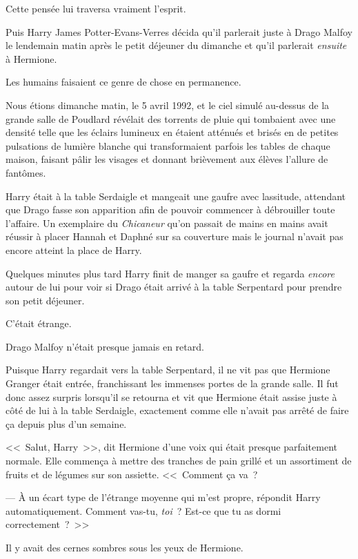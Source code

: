 Cette pensée lui traversa vraiment l'esprit.

Puis Harry James Potter-Evans-Verres décida qu'il parlerait juste à Drago Malfoy le lendemain matin après le petit déjeuner du dimanche et qu'il parlerait \emph{ensuite} à Hermione.

Les humains faisaient ce genre de chose en permanence.

\later

Nous étions dimanche matin, le 5 avril 1992, et le ciel simulé au-dessus de la grande salle de Poudlard révélait des torrents de pluie qui tombaient avec une densité telle que les éclairs lumineux en étaient atténués et brisés en de petites pulsations de lumière blanche qui transformaient parfois les tables de chaque maison, faisant pâlir les visages et donnant brièvement aux élèves l'allure de fantômes.

Harry était à la table Serdaigle et mangeait une gaufre avec lassitude, attendant que Drago fasse son apparition afin de pouvoir commencer à débrouiller toute l'affaire. Un exemplaire du \emph{Chicaneur} qu'on passait de mains en mains avait réussir à placer Hannah et Daphné sur sa couverture mais le journal n'avait pas encore atteint la place de Harry.

Quelques minutes plus tard Harry finit de manger sa gaufre et regarda \emph{encore} autour de lui pour voir si Drago était arrivé à la table Serpentard pour prendre son petit déjeuner.

C'était étrange.

Drago Malfoy n'était presque jamais en retard.

Puisque Harry regardait vers la table Serpentard, il ne vit pas que Hermione Granger était entrée, franchissant les immenses portes de la grande salle. Il fut donc assez surpris lorsqu'il se retourna et vit que Hermione était assise juste à côté de lui à la table Serdaigle, exactement comme elle n'avait pas arrêté de faire ça depuis plus d'un semaine.

<<~Salut, Harry~>>, dit Hermione d'une voix qui était presque parfaitement normale. Elle commença à mettre des tranches de pain grillé et un assortiment de fruits et de légumes sur son assiette. <<~Comment ça va~?

--- À un écart type de l'étrange moyenne qui m'est propre, répondit Harry automatiquement. Comment vas-tu, \emph{toi}~? Est-ce que tu as dormi correctement~?~>>

Il y avait des cernes sombres sous les yeux de Hermione.

